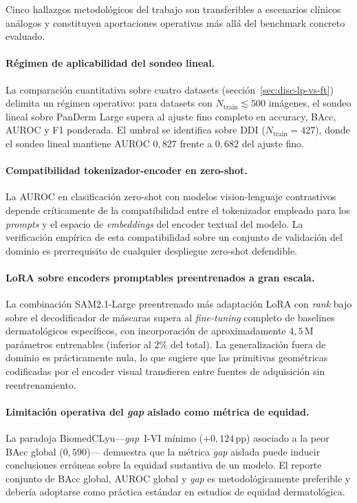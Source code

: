 Cinco hallazgos metodológicos del trabajo son transferibles a
escenarios clínicos análogos y constituyen aportaciones operativas
más allá del benchmark concreto evaluado.

\paragraph{Régimen de aplicabilidad del sondeo lineal.}
La comparación cuantitativa sobre cuatro datasets
(secci\'on~\ref{sec:disc-lp-vs-ft}) delimita un régimen operativo: para
datasets con $N_{\mathrm{train}} \lesssim 500$ imágenes, el
sondeo lineal sobre PanDerm Large supera al ajuste fino completo
en accuracy, BAcc, AUROC y F1 ponderada. El umbral se identifica
sobre DDI ($N_{\mathrm{train}} = 427$), donde el sondeo lineal
mantiene AUROC $0{,}827$ frente a $0{,}682$ del ajuste fino.

\paragraph{Compatibilidad tokenizador-encoder en zero-shot.}
La AUROC en clasificación zero-shot con modelos vision-lenguaje
contrastivos depende críticamente de la compatibilidad entre el
tokenizador empleado para los \emph{prompts} y el espacio de
\emph{embeddings} del encoder textual del modelo. La verificación
empírica de esta compatibilidad sobre un conjunto de validación
del dominio es prerrequisito de cualquier despliegue zero-shot
defendible.

\paragraph{LoRA sobre encoders promptables preentrenados a gran
escala.}
La combinación SAM2.1-Large preentrenado más adaptación LoRA con
\emph{rank} bajo sobre el decodificador de máscaras supera al
\emph{fine-tuning} completo de baselines dermatológicos
específicos, con incorporación de aproximadamente $4{,}5$\,M
parámetros entrenables (inferior al $2\%$ del total). La
generalización fuera de dominio es prácticamente nula, lo que
sugiere que las primitivas geométricas codificadas por el encoder
visual transfieren entre fuentes de adquisición sin
reentrenamiento.

\paragraph{Limitación operativa del \emph{gap} aislado como métrica
de equidad.}
La paradoja BiomedCLyu---\emph{gap}~I-VI mínimo ($+0{,}124$\,pp)
asociado a la peor BAcc global ($0{,}590$)--- demuestra que la
métrica \emph{gap} aislada puede inducir conclusiones erróneas
sobre la equidad sustantiva de un modelo. El reporte conjunto de
BAcc global, AUROC global y \emph{gap} es metodológicamente
preferible y debería adoptarse como práctica estándar en estudios
de equidad dermatológica.

